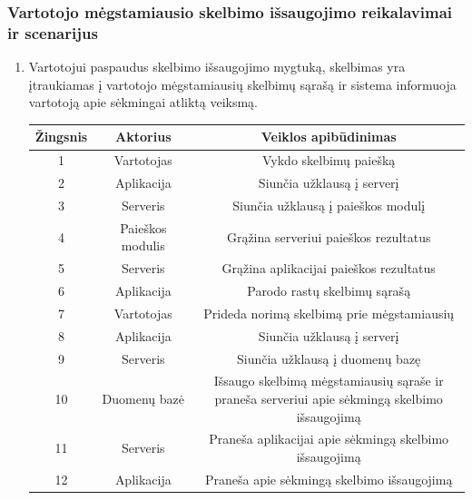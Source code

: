 \documentclass[12pt]{article}
\begin{document}
	\subsubsection{Vartotojo mėgstamiausio skelbimo išsaugojimo reikalavimai ir scenarijus}
	\begin{enumerate}
		\item Vartotojui paspaudus skelbimo išsaugojimo mygtuką, skelbimas yra įtraukiamas į vartotojo mėgstamiausių skelbimų sąrašą ir sistema informuoja vartotoją apie sėkmingai atliktą veiksmą.
		
		\begin{center}
		\begin{tabular}{ | c | c | c | }
			\hline
			Žingsnis & Aktorius         & Veiklos apibūdinimas \\ \hline
			1        & Vartotojas       & Vykdo skelbimų paiešką \\ \hline
			2        & Aplikacija       & Siunčia užklausą į serverį \\ \hline
			3        & Serveris         & Siunčia užklausą į paieškos modulį \\ \hline
			4        & Paieškos modulis & Grąžina serveriui paieškos rezultatus \\ \hline
			5        & Serveris         & Grąžina aplikacijai paieškos rezultatus  \\ \hline
			6        & Aplikacija       & Parodo rastų skelbimų sąrašą \\ \hline
			7        & Vartotojas       & Prideda norimą skelbimą prie mėgstamiausių \\ \hline
			8        & Aplikacija       & Siunčia užklausą į serverį \\ \hline
			9        & Serveris         & Siunčia užklausą į duomenų bazę \\ \hline
			10       & Duomenų bazė     & \makecell{Išsaugo skelbimą mėgstamiausių sąraše ir \\ praneša serveriui apie sėkmingą skelbimo išsaugojimą} \\ \hline
			11       & Serveris         & Praneša aplikacijai apie sėkmingą skelbimo išsaugojimą \\ \hline
			12       & Aplikacija       & Praneša apie sėkmingą skelbimo išsaugojimą \\ \hline
		\end{tabular}
		\end{center}	
		\pagebreak		
	\end{enumerate}	
	\pagebreak
	
\end{document}

